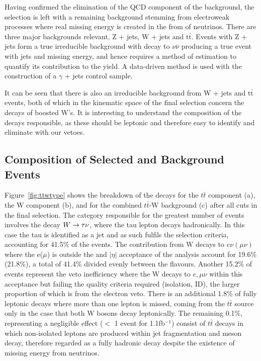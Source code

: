 Having confirmed the elimination of the QCD component of the background, the selection is left with a remaining background stemming from electroweak processes where real missing energy is created in the from of neutrinos. There are three major backgrounds relevant, Z + jets, W + jets and t$\bar{\textrm{t}}$. Events with  Z + jets form a true irreducible background with decay to $\nu \bar{\nu}$ producing a true event with jets and missing energy, and hence requires a method of estimation to quantify its contribution to the yield. A data-driven method is used with the construction of a $\gamma$ + jets control sample.

It can be seen that there is also an irreducible background from W + jets  and t$\bar{\textrm{t}}$ events, both of which in the kinematic space of the final selection concern the decays of boosted W's. It is interesting to understand the composition of the decays responsible, as these should be leptonic and therefore easy to identify and eliminate with our vetoes. 

\subsection{Composition of Selected \ttj and \wj Background Events}
\label{sec:ttwcomp}
Figure~\ref{fig:ttwtype} shows the breakdown of the decays for the  $t\bar{t}$ component (a), the W component (b), and for the combined $t\bar{t}$-W background (c) after all cuts in the final selection. The category responsible for the greatest number of events involves the decay $W \rightarrow \tau \nu$, where the tau lepton decays hadronically. In this case the tau is identified as a jet and as such fulfils the selection criteria, accounting for 41.5\% of the events. The contribution from W decays to $e \nu(\mu \nu)$  where the e($\mu$) is outside the \Pt and $|\eta|$ acceptance of the analysis account for 19.6\%(21.8\%), a total of 41.4\%  divided evenly between the flavours. Another 15.2\% of events represent the veto inefficiency where the W decays to $e, \mu \nu$ within this acceptance but failing the quality criteria required (isolation, ID), the larger proportion of which is from the electron veto. There is an additional 1.8\% of fully leptonic decays where more than one lepton is missed, coming from the  $t\bar{t}$ source only in the case that both W bosons decay leptonically. The remaining 0.1\%, representing a negligible effect ($<$ 1 event for 1.1fb$^{-1}$) consist of  $t\bar{t}$ decays in which non-isolated leptons are produced within jet fragmentation and meson decay, therefore regarded as a fully hadronic decay despite the existence of missing energy from neutrinos. 

